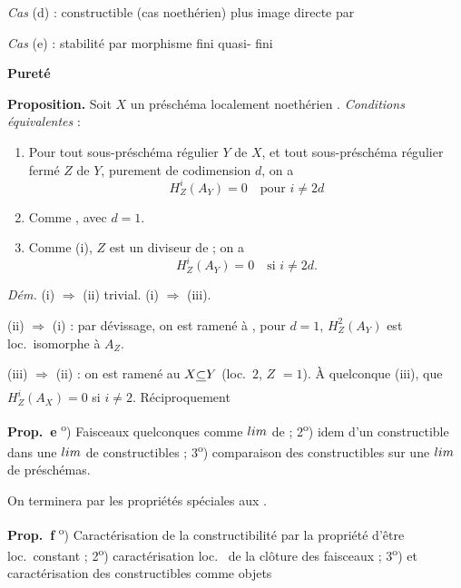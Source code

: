 \documentclass[11pt,a4paper]{article}
\begin{document}
\emph{Cas} (d) : constructible \ill{} (cas noethérien) \ill{} plus image
directe par \ill{}

\emph{Cas} (e) : stabilité par \struck{\ill{}} morphisme fini \ill{}
quasi-\ill{} fini \ill{}

\textbf{Pureté}

\textbf{Proposition.} Soit $X$ un préschéma localement noethérien
. \emph{Conditions équivalentes} :
\begin{enumerate}
\item[(i)] Pour  tout sous-préschéma régulier $Y$ de $X$, et tout
  sous-préschéma régulier fermé $Z$ de $Y$, purement de codimension $d$, on a
  \[
    H^{i}_{Z}(A_Y) = 0 \quad \text{pour } i \neq 2d
  \]
\item[(ii)] Comme , avec $d = 1$.
\item[(iii)]  Comme (i), \ill{}
  $Z$ est un diviseur de \ill{} ; on a
  \[
    H^{i}_{Z}(A_Y) = 0 \quad \text{si } i \neq 2d .
  \]
\end{enumerate}


\emph{Dém.} (i) $\Rightarrow$ (ii) trivial. (i) $\Rightarrow$ (iii).

(ii) $\Rightarrow$ (i) : par dévissage, on est ramené à \ill{}, pour $d = 1$,
$H^{2}_{Z}(A_Y)$ est loc.\ isomorphe à $A_Z$.

(iii) $\Rightarrow$ (ii) : on est ramené au \ill{} 
$X \struck{\subset} Y$ (loc.\ $2$, \ill{} $Z$ \ill{} $= 1$). À \ill{}
quelconque \ill{} (iii), que $H^{i}_{Z}(A_X) = 0$ si $i \neq 2$.
Réciproquement

\textbf{Prop.\ e} \textsuperscript{o}) Faisceaux quelconques comme
$\varinjlim$ de \ill{} ; 2\textsuperscript{o}) idem d'un constructible dans
une $\varinjlim$ de constructibles ; 3\textsuperscript{o}) comparaison des
constructibles sur une $\varprojlim$ de préschémas.


On terminera par les propriétés spéciales aux .

\textbf{Prop.\ f} \textsuperscript{o}) Caractérisation de la
constructibilité par la propriété d'être loc.\ constant \ill{} ;
2\textsuperscript{o}) caractérisation loc.\ \ill{} de la clôture des
faisceaux \ill{} ; 3\textsuperscript{o}) et caractérisation des
constructibles comme objets \ill{}
\end{document}
